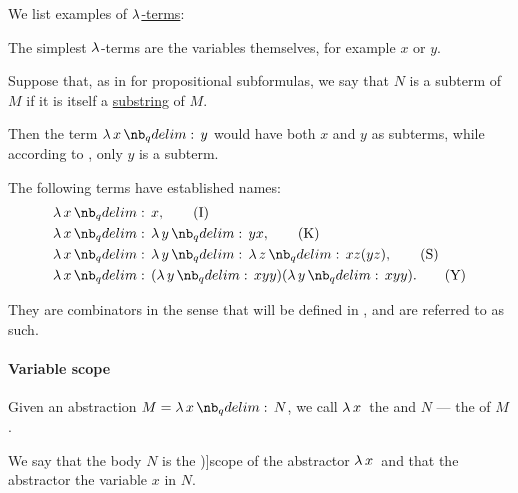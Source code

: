 \begin{example}\label{ex:def:untyped_lambda_term}
  We list examples of \hyperref[def:untyped_lambda_term]{\( \mathrm{\lambda} \)-terms}:
  \begin{thmenum}
     The simplest \( \mathrm{\lambda} \)-terms are the variables themselves, for example \( x \) or \( y \).

     Suppose that, as in  for propositional subformulas, we say that \( N \) is a subterm of \( M \) if it is itself a \hyperref[def:formal_language/substring]{substring} of \( M \).

    Then the term \( \qabs x y \) would have both \( x \) and \( y \) as subterms, while according to , only \( y \) is a subterm.

     The following terms have established names:
    \begin{align}
      &\qabs x x, \label{eq:ex:def:untyped_lambda_term/combinator/i}\tag{I} \\
      &\qabs x \qabs y yx, \nonumber\label{eq:ex:def:untyped_lambda_term/combinator/k}\tag{K} \\
      &\qabs x \qabs y \qabs z xz(yz), \label{eq:ex:def:untyped_lambda_term/combinator/s}\tag{S} \\
      &\qabs x (\qabs y xyy) (\qabs y xyy). \label{eq:ex:def:untyped_lambda_term/combinator/y}\tag{Y}
    \end{align}

    They are combinators in the sense that will be defined in , and are referred to as such.
  \end{thmenum}
\end{example}

\paragraph{Variable scope}

\begin{definition}\label{def:lambda_abstractor}
  Given an abstraction \( M = \qabs x N \), we call \( \quantifier* \synlambda x \) the  and \( N \) --- the  of \( M \).

  We say that the body \( N \) is the \term[ru=область действия (\cite[64]{Герасимов2011})]{scope} of the abstractor \( \quantifier* \synlambda x \) and that the abstractor  the variable \( x \) in \( N \).
\end{definition}

